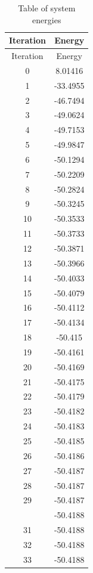 \documentclass[12pt,a4paper]{article}
\numberwithin{equation}{section}
\numberwithin{figure}{section}
\numberwithin{table}{section}
\begin{document}
	\begin{longtable}{|c|c|}
		\caption{Table of system energies}
		\label{tab:energy}\\
		\hline
		Iteration & Energy\\
		\hline
		\endfirsthead
		
		\hline
		Iteration & Energy\\
		\hline
		\endhead
		
0 & 8.01416 \\ \hline
1 & -33.4955 \\ \hline
2 & -46.7494 \\ \hline
3 & -49.0624 \\ \hline
4 & -49.7153 \\ \hline
5 & -49.9847 \\ \hline
6 & -50.1294 \\ \hline
7 & -50.2209 \\ \hline
8 & -50.2824 \\ \hline
9 & -50.3245 \\ \hline
10 & -50.3533 \\ \hline
11 & -50.3733 \\ \hline
12 & -50.3871 \\ \hline
13 & -50.3966 \\ \hline
14 & -50.4033 \\ \hline
15 & -50.4079 \\ \hline
16 & -50.4112 \\ \hline
17 & -50.4134 \\ \hline
18 & -50.415 \\ \hline
19 & -50.4161 \\ \hline
20 & -50.4169 \\ \hline
21 & -50.4175 \\ \hline
22 & -50.4179 \\ \hline
23 & -50.4182 \\ \hline
24 & -50.4183 \\ \hline
25 & -50.4185 \\ \hline
26 & -50.4186 \\ \hline
27 & -50.4187 \\ \hline
28 & -50.4187 \\ \hline
29 & -50.4187 \\ \hline
\pagebreak
30 & -50.4188 \\ \hline
31 & -50.4188 \\ \hline
32 & -50.4188 \\ \hline
33 & -50.4188 \\ \hline

\end{longtable}
\end{document}
